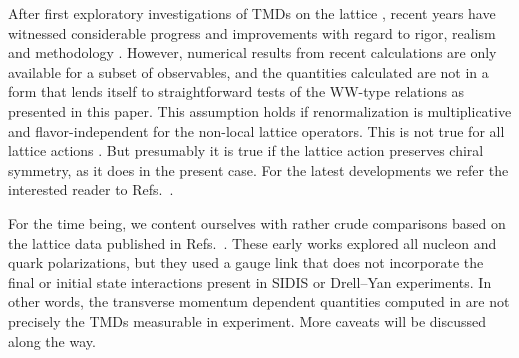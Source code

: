 \documentclass[a4paper,11pt]{article}
\begin{document}
After first exploratory investigations of TMDs on the lattice
\cite{Hagler:2009mb,Musch:2010ka}, recent years have witnessed considerable
progress and improvements with regard to rigor, realism and methodology
\cite{Yoon:2017qzo, %
Engelhardt:2015xja,%
Ji:2014hxa,%
Musch:2011er%
}.
However, numerical results from recent calculations are only available
for a subset of observables, and the quantities calculated are not in a
form that lends itself to straightforward tests of the WW-type relations
as presented in this paper.
   {This assumption holds if renormalization is multiplicative and
   flavor-independent for the non-local lattice operators. This is
   not true for all lattice actions \cite{Musch:2010ka}. %
   But presumably it is true
   if the lattice action preserves chiral symmetry, as it does in
   the present case. For the latest developments we refer the
   interested reader to Refs.~\cite{Alexandrou:2017dzj,Ishikawa:2017faj,
	Engelhardt:2015xja,%
	Ji:2014hxa,%
	Musch:2011er,%
   Ji:2017oey,Yoon:2017qzo,Green:2017xeu,Zhang:2017bzy}.}

For the time being, we content ourselves with rather crude comparisons
based on the lattice data
published in Refs.~\cite{Hagler:2009mb,Musch:2010ka}.
These early works explored all nucleon and quark polarizations, but
they used a gauge link that does not incorporate the final or initial
state interactions present in SIDIS or Drell--Yan experiments. In other
words, the transverse momentum dependent quantities computed in
\cite{Hagler:2009mb,Musch:2010ka} are not precisely the TMDs measurable
in experiment. More caveats will be discussed along the way.
\end{document}
